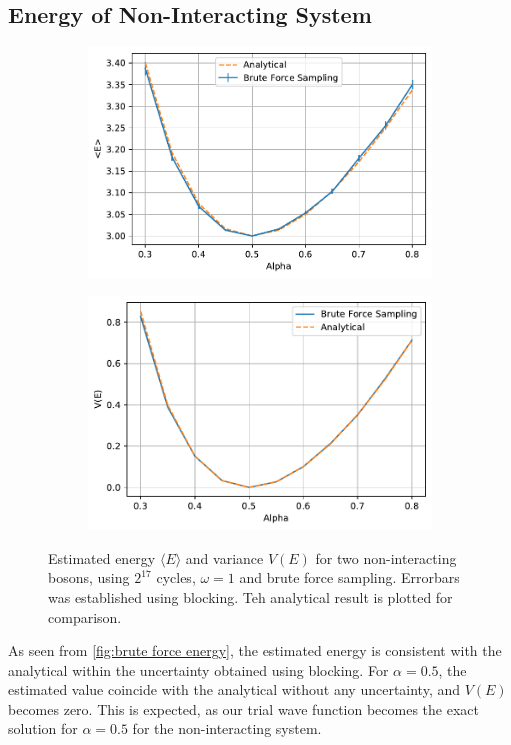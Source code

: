 \subsection{Energy of Non-Interacting System}
\begin{figure}
	\begin{subfigure}{\textwidth}
		\centering
		\includegraphics[width=.8\linewidth]{figures/energy_bruteforce1.pdf}
	\end{subfigure}%
	\begin{subfigure}{\textwidth}
		\centering
		\includegraphics[width=.8\linewidth]{figures/variance_bruteforce1.pdf}
	\end{subfigure}%
	\centering
	\caption{Estimated energy $\langle E \rangle$ and variance $V(E)$ for two non-interacting bosons, using $2^{17}$ cycles, $\omega = 1$ and brute force sampling. Errorbars was established using blocking. Teh analytical result is plotted for comparison. }
	\label{fig:brute force energy}
\end{figure}

As seen from \autoref{fig:brute force energy}, the estimated energy is consistent with the analytical within the uncertainty obtained using blocking. For $\alpha = 0.5$, the estimated value coincide with the analytical without any uncertainty, and $V(E)$ becomes zero. This is expected, as our trial wave function becomes the exact solution for $\alpha = 0.5$ for the non-interacting system.  


